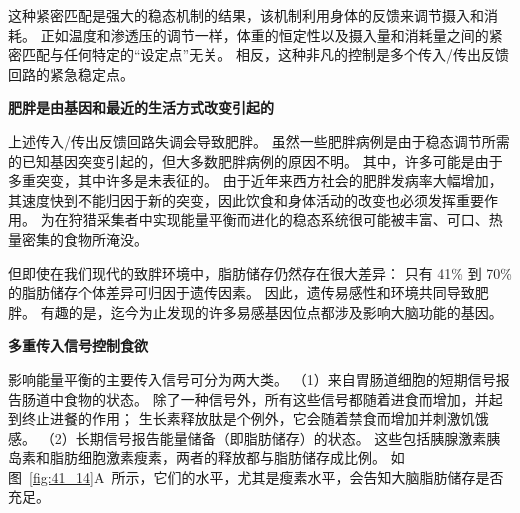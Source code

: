 这种紧密匹配是强大的稳态机制的结果，该机制利用身体的反馈来调节摄入和消耗。
正如温度和渗透压的调节一样，体重的恒定性以及摄入量和消耗量之间的紧密匹配与任何特定的“设定点”无关。
相反，这种非凡的控制是多个传入/传出反馈回路的紧急稳定点。


\textbf{肥胖是由基因和最近的生活方式改变引起的}

上述传入/传出反馈回路失调会导致肥胖。
虽然一些肥胖病例是由于稳态调节所需的已知基因突变引起的，但大多数肥胖病例的原因不明。
其中，许多可能是由于多重突变，其中许多是未表征的。
由于近年来西方社会的肥胖发病率大幅增加，其速度快到不能归因于新的突变，因此饮食和身体活动的改变也必须发挥重要作用。
为在狩猎采集者中实现能量平衡而进化的稳态系统很可能被丰富、可口、热量密集的食物所淹没。


但即使在我们现代的致胖环境中，脂肪储存仍然存在很大差异：
只有 41\% 到 70\% 的脂肪储存个体差异可归因于遗传因素。
因此，遗传易感性和环境共同导致肥胖。
有趣的是，迄今为止发现的许多易感基因位点都涉及影响大脑功能的基因。


\textbf{多重传入信号控制食欲}

影响能量平衡的主要传入信号可分为两大类。
（1）来自胃肠道细胞的短期信号报告肠道中食物的状态。
除了一种信号外，所有这些信号都随着进食而增加，并起到终止进餐的作用；
生长素释放肽是个例外，它会随着禁食而增加并刺激饥饿感。
（2）长期信号报告能量储备（即脂肪储存）的状态。 
这些包括胰腺激素胰岛素和脂肪细胞激素瘦素，两者的释放都与脂肪储存成比例。
如图~\ref{fig:41_14}A~所示，它们的水平，尤其是瘦素水平，会告知大脑脂肪储存是否充足。



